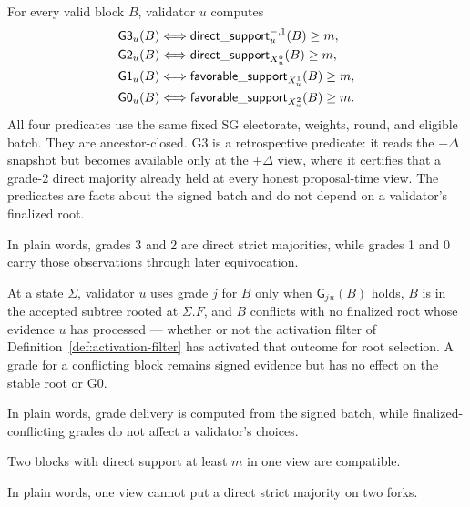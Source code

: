 \begin{definition}\label{def:grades}
For every valid block \(B\), validator \(u\) computes
\begin{align*}
 \mathsf{G3}_u(B)&\Longleftrightarrow
      \mathsf{direct\_support}_u^{-,1}(B)\geq m,\\
 \mathsf{G2}_u(B)&\Longleftrightarrow
      \mathsf{direct\_support}_{X_u^0}(B)\geq m,\\
 \mathsf{G1}_u(B)&\Longleftrightarrow
      \mathsf{favorable\_support}_{X_u^1}(B)\geq m,\\
 \mathsf{G0}_u(B)&\Longleftrightarrow
      \mathsf{favorable\_support}_{X_u^2}(B)\geq m.
\end{align*}
All four predicates use the same fixed SG electorate, weights, round, and
eligible batch.  They are ancestor-closed.  G3 is a retrospective
predicate: it reads the \(-\Delta\) snapshot but becomes available only
at the \(+\Delta\) view, where it certifies that a grade-2 direct
majority already held at every honest proposal-time view.  The predicates are facts about
the signed batch and do not depend on a validator's finalized root.

In plain words, grades 3 and 2 are direct strict majorities, while grades 1
and 0 carry those observations through later equivocation.
\end{definition}

\begin{definition}\label{def:active-grade}
At a state \(\Sigma\), validator \(u\) uses grade \(j\) for \(B\) only when
\(\mathsf G_j{}_u(B)\) holds, \(B\) is in the accepted subtree rooted at
\(\Sigma.F\), and \(B\) conflicts with no finalized root whose evidence
\(u\) has processed --- whether or not the activation filter of
Definition~\ref{def:activation-filter} has activated that outcome for
root selection.  A grade for a conflicting block remains
signed evidence but has no effect on the stable root or G0.

In plain words, grade delivery is computed from the signed batch, while
finalized-conflicting grades do not affect a validator's choices.
\end{definition}

\begin{lemma}
\label{lem:direct-roots-chain}
Two blocks with direct support at least \(m\) in one view are compatible.

In plain words, one view cannot put a direct strict majority on two forks.
\end{lemma}

